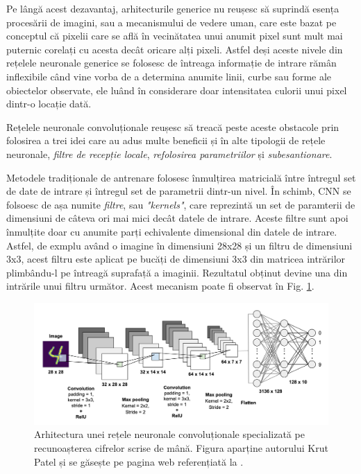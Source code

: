 \documentclass[a4paper,12pt]{book}
\begin{document}
				Pe lângă acest dezavantaj, arhitecturile generice nu reușesc să suprindă esența procesării de imagini, sau a mecanismului de vedere uman, care este bazat pe conceptul că pixelii care se află în vecinătatea unui anumit pixel sunt mult mai puternic corelați cu acesta decât oricare alți pixeli. Astfel deși aceste nivele din rețelele neuronale generice se folosesc de întreaga informație de intrare rămân inflexibile când vine vorba de a determina anumite linii, curbe sau forme ale obiectelor observate, ele luând în considerare doar intensitatea culorii unui pixel dintr-o locație dată. \par
				
				Rețelele neuronale convoluționale reușesc să treacă peste aceste obstacole prin folosirea a trei idei care au adus multe beneficii și în alte tipologii de rețele neuronale,\textit{ filtre de recepție locale}, \textit{refolosirea parametriilor} și \textit{subesantionare}. \par
				
				Metodele tradiționale de antrenare folosesc înmulțirea matricială între întregul set de date de intrare și întregul set de parametrii dintr-un nivel. În schimb, CNN se folsoesc de așa numite \textit{filtre}, sau \textit{"kernels"}, care reprezintă un set de paramterii de dimensiuni de câteva ori mai mici decât datele de intrare. Aceste filtre sunt apoi înmulțite doar cu anumite parți echivalente dimensional din datele de intrare. Astfel, de exmplu având o imagine în dimensiuni 28x28 și un filtru de dimensiuni 3x3, acest filtru este aplicat pe bucăți de dimensiuni 3x3 din matricea intrărilor plimbându-l pe întreagă suprafață a imaginii. Rezultatul obținut devine una din intrările unui filtru următor. Acest mecanism poate fi observat în Fig. \ref{fig:cnns}.
					
				\begin{figure}[t]
					\centering
					\includegraphics[scale=0.23]{cnns}
					\caption{Arhitectura unei rețele neuronale convoluționale specializată pe recunoașterea cifrelor scrise de mână. Figura aparține autorului Krut Patel și se găsește pe pagina web referențiată la \cite{cnn_photo}.} 
					\label{fig:cnns}
				\end{figure}
				
\end{document}
